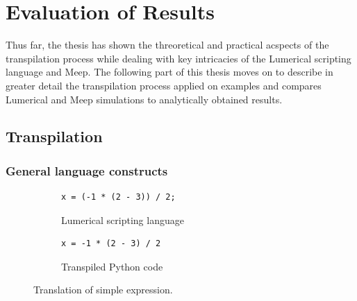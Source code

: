 \chapter{Evaluation of Results}\label{sec:results}
Thus far, the thesis has shown the threoretical and practical acspects of the transpilation process while dealing with key intricacies of the Lumerical scripting language and Meep. The following part of this thesis moves on to describe in greater detail the transpilation process applied on examples and compares Lumerical and Meep simulations to analytically obtained results.
\section{Transpilation}

\subsection{General language constructs}
\begin{figure}[H]\label{fig:lumerical-pyhton-expression}
  \centering

  \begin{subfigure}[t]{0.4\textwidth}
    \begin{lstlisting}[style=lumerical]
x = (-1 * (2 - 3)) / 2;
    \end{lstlisting}
    \caption{Lumerical scripting language}
  \end{subfigure}
  \hfill
  \begin{subfigure}[t]{0.4\textwidth}
    \begin{lstlisting}[style=python]
x = -1 * (2 - 3) / 2
    \end{lstlisting}
    \caption{Transpiled Python code}
  \end{subfigure}

  \caption{Translation of simple expression.}
  
\end{figure}






